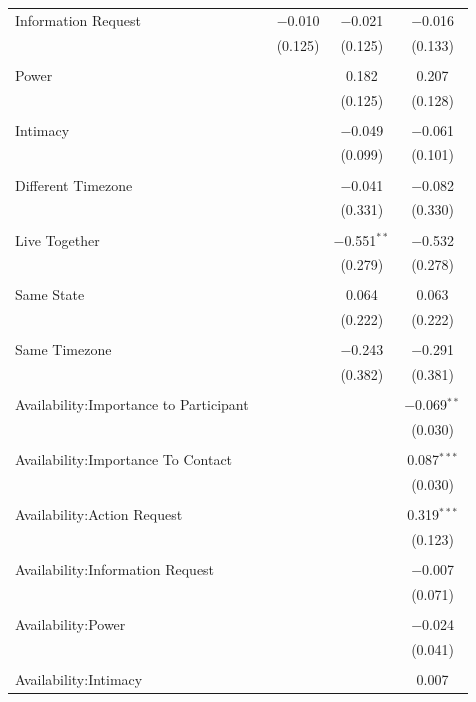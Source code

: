 \documentclass[12pt]{nuthesis}	%
\begin{document}
\begin{table}[!htbp]
\begin{tabular}{@{\extracolsep{5pt}}lcccc}
 Information Request &  & $-$0.010 & $-$0.021 & $-$0.016 \\ 
  &  & (0.125) & (0.125) & (0.133) \\ 
  & & & & \\ 
 Power &  &  & 0.182 & 0.207 \\ 
  &  &  & (0.125) & (0.128) \\ 
  & & & & \\ 
 Intimacy &  &  & $-$0.049 & $-$0.061 \\ 
  &  &  & (0.099) & (0.101) \\ 
  & & & & \\ 
 Different Timezone &  &  & $-$0.041 & $-$0.082 \\ 
  &  &  & (0.331) & (0.330) \\ 
  & & & & \\ 
Live Together &  &  & $-$0.551$^{**}$ & $-$0.532 \\ 
  &  &  & (0.279) & (0.278) \\ 
  & & & & \\ 
Same State &  &  & 0.064 & 0.063 \\ 
  &  &  & (0.222) & (0.222) \\ 
  & & & & \\ 
 Same Timezone &  &  & $-$0.243 & $-$0.291 \\ 
  &  &  & (0.382) & (0.381) \\ 
  & & & & \\ 
 Availability:Importance to Participant &  &  &  & $-$0.069$^{**}$ \\ 
  &  &  &  & (0.030) \\ 
  & & & & \\ 
 Availability:Importance To Contact &  &  &  & 0.087$^{***}$ \\ 
  &  &  &  & (0.030) \\ 
  & & & & \\ 
 Availability:Action Request &  &  &  & 0.319$^{***}$ \\ 
  &  &  &  & (0.123) \\ 
  & & & & \\ 
 Availability:Information Request &  &  &  & $-$0.007 \\ 
  &  &  &  & (0.071) \\ 
  & & & & \\ 
 Availability:Power &  &  &  & $-$0.024 \\ 
  &  &  &  & (0.041) \\ 
  & & & & \\ 
 Availability:Intimacy &  &  &  & 0.007 \\ 

\end{tabular}
\end{table}
\end{document}

